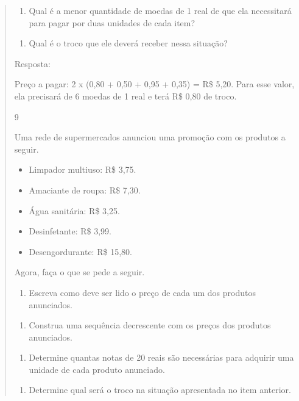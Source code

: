 \begin{mdframed}[linewidth=2pt,linecolor=salmao,roundcorner=2pt]
\begin{itemize}
{\begin{itemize}
\begin{escolha}
{\begin{quote}
{\begin{escolha}
\begin{enumerate}
\item
  Qual é a menor quantidade de moedas de 1 real de que ela necessitará para
  pagar por duas unidades de cada item?
\end{enumerate}

\begin{enumerate}
\item
  Qual é o troco que ele deverá receber nessa situação?
\end{enumerate}

Resposta:

Preço a pagar: 2 x (0,80 + 0,50 + 0,95 + 0,35) = R\$ 5,20. Para esse
valor, ela precisará de 6 moedas de 1 real e terá R\$ 0,80 de troco.

\num{9}

Uma rede de supermercados anunciou uma promoção com os produtos a seguir.

\begin{itemize}
  \item Limpador multiuso: R\$ 3,75.
  \item Amaciante de roupa: R\$ 7,30.
  \item Água sanitária: R\$ 3,25.
  \item Desinfetante: R\$ 3,99.
  \item Desengordurante: R\$ 15,80.
\end{itemize}

Agora, faça o que se pede a seguir.

\begin{enumerate}
\item
  Escreva como deve ser lido o preço de cada um dos produtos anunciados.
\end{enumerate}

\begin{enumerate}
\item
  Construa uma sequência decrescente com os preços dos produtos
  anunciados.
\end{enumerate}

\begin{enumerate}
\item
  Determine quantas notas de 20 reais são necessárias para adquirir uma unidade de
  cada produto anunciado.
\end{enumerate}

\begin{enumerate}
\item
  Determine qual será o troco na situação apresentada no item anterior.
\end{enumerate}


\end{escolha}}
\end{quote}}
\end{escolha}
\end{itemize}}
\end{itemize}
\end{mdframed}
